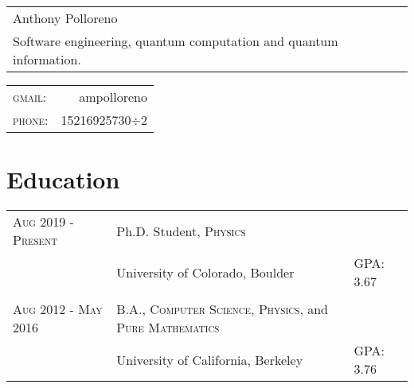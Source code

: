 \documentclass[a4paper,10pt]{article}
\begin{document}
\newcommand*{\fontin}[2]{{\setmainfont{Fontin}#1{#2}}}

\pagestyle{empty} %




\begin{tabular}{p{2.6in}}
{\Huge Anthony Polloreno}\\
Software engineering, quantum computation and quantum information.\\
\end{tabular}
\hfill
\begin{tabular}{lr}
    \fontin{\textsc}{gmail:}     & ampolloreno\\
    \fontin{\textsc}{phone:}     & 15216925730$\div$2
    \end{tabular}

\section{Education}
\begin{tabular}{l|ll}
  \fontin{\textsc}{Aug 2019 - Present} & Ph.D. Student, \fontin{\textsc}{Physics} \\ & University of Colorado, Boulder & GPA: 3.67 \\ \\
  \fontin{\textsc}{Aug 2012 - May 2016} & B.A., \fontin{\textsc}{Computer Science}, \fontin{\textsc}{Physics}, and \fontin{\textsc}{Pure Mathematics} \\ &University of California, Berkeley & GPA: 3.76 \\
\end{tabular}
\end{document}
